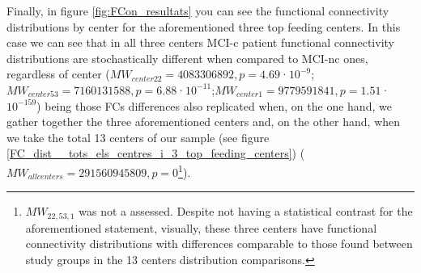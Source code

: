 \documentclass[a4paper,12pt]{elsarticle}  %
\begin{document}
		Finally, in figure \ref{fig:FCon_resultats} you can see the functional connectivity distributions by center for the aforementioned three top feeding centers. In this case we can see that in all three centers MCI-c patient functional connectivity distributions are stochastically different when compared to MCI-nc ones, regardless of center ($MW_{center 22} = 4083306892, p = 4.69$·$10^{-9}$;$MW_{center 53} = 7160131588, p = 6.88$·$10^{-11}$;$MW_{center 1} = 9779591841, p = 1.51$·$10^{-159}$) being those FCs differences also replicated when, on the one hand, we gather together the three aforementioned centers and, on the other hand, when we take the total 13 centers of our sample (see figure \ref{FC_dist__tots_els_centres_i_3_top_feeding_centers}) ($MW_{all centers} =  291560945809, p = 0$\footnote{$MW_{22,53,1}$ was not a assessed. Despite not having a statistical contrast for the aforementioned statement, visually, these three centers have functional connectivity distributions with differences comparable to those found between study groups in the 13 centers distribution comparisons.}).

		
\FloatBarrier
\end{document}
